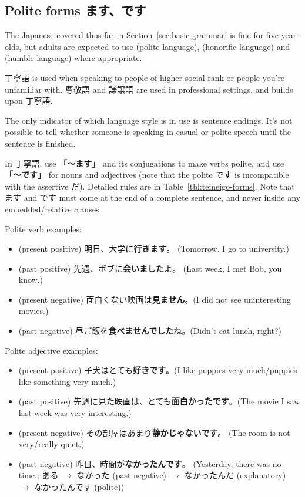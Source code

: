 \documentclass[../nihongo-gakushuu-kyouzai.tex]{subfiles}
\begin{document}
\subsection{Polite forms ます、です}

The Japanese covered thus far in Section~\ref{sec:basic-grammar} is fine for five-year-olds, but adults are expected to use  (polite language),  (honorific language) and  (humble language) where appropriate.

丁寧語 is used when speaking to people of higher social rank or people you're unfamiliar with. 尊敬語 and 謙譲語 are used in professional settings, and builds upon 丁寧語.

The only indicator of which language style is in use is sentence endings. It's not possible to tell whether someone is speaking in casual or polite speech until the sentence is finished.

In 丁寧語, use \textbf{「〜ます」} and its conjugations to make verbs polite, and use \textbf{「〜です」} for nouns and adjectives (note that the polite です is incompatible with the assertive だ). Detailed rules are in Table~\ref{tbl:teineigo-forms}. Note that ます and です must come at the end of a complete sentence, and never inside any embedded/relative clauses.

Polite verb examples:
\begin{itemize}
    \item (present positive) 明日、大学に\textbf{行きます}。 (Tomorrow, I go to university.)
    \item (past positive) 先週、ボブに\textbf{会いました}よ。 (Last week, I met Bob, you know.)
    \item (present negative) 面白くない映画は\textbf{見ません}。(I did not see uninteresting movies.)
    \item (past negative) 昼ご飯を\textbf{食べませんでした}ね。(Didn't eat lunch, right?)
\end{itemize}

Polite adjective examples:
\begin{itemize}
    \item (present positive) 子犬はとても\textbf{好きです}。(I like puppies very much/puppies like something very much.)
    \item (past positive) 先週に見た映画は、とても\textbf{面白かったです}。(The movie I saw last week was very interesting.)
    \item (present negative) その部屋はあまり\textbf{静かじゃないです}。 (The room is not very/really quiet.)
    \item (past negative) 昨日、時間が\textbf{なかったんです}。 (Yesterday, there was no time.; ある $\to$ \ul{なかった} (past negative) $\to$ なかった\ul{んだ} (explanatory) $\to$ なかったん\ul{です} (polite))
\end{itemize}
\end{document}
